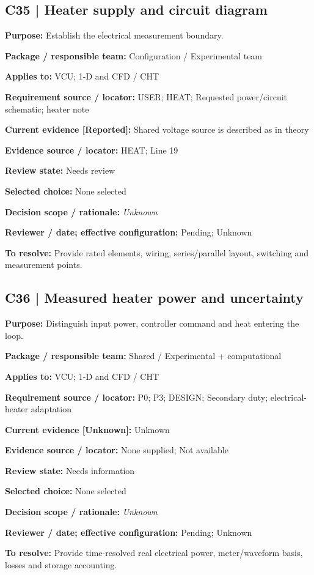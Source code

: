 \documentclass[11pt]{article}
\begin{document}
\begin{minipage}{\textwidth}\small\setlength{\parskip}{2pt}
\subsection*{C35 | Heater supply and circuit diagram}
\textbf{Purpose:} Establish the electrical measurement boundary.\par
\textbf{Package / responsible team:} Configuration / Experimental team\par
\textbf{Applies to:} VCU; 1-D and CFD / CHT\par
\textbf{Requirement source / locator:} USER; HEAT; Requested power/circuit schematic; heater note\par
\textbf{Current evidence [Reported]:} Shared voltage source is described as in theory\par
\textbf{Evidence source / locator:} HEAT; Line 19\par
\textbf{Review state:} Needs review\par
\textbf{Selected choice:} None selected\par
\textbf{Decision scope / rationale:} \textit{Unknown}\par
\textbf{Reviewer / date; effective configuration:} Pending; Unknown\par
\textbf{To resolve:} Provide rated elements, wiring, series/parallel layout, switching and measurement points.\par
\end{minipage}\par\vspace{5pt}
\begin{minipage}{\textwidth}\small\setlength{\parskip}{2pt}
\subsection*{C36 | Measured heater power and uncertainty}
\textbf{Purpose:} Distinguish input power, controller command and heat entering the loop.\par
\textbf{Package / responsible team:} Shared / Experimental + computational\par
\textbf{Applies to:} VCU; 1-D and CFD / CHT\par
\textbf{Requirement source / locator:} P0; P3; DESIGN; Secondary duty; electrical-heater adaptation\par
\textbf{Current evidence [Unknown]:} Unknown\par
\textbf{Evidence source / locator:} None supplied; Not available\par
\textbf{Review state:} Needs information\par
\textbf{Selected choice:} None selected\par
\textbf{Decision scope / rationale:} \textit{Unknown}\par
\textbf{Reviewer / date; effective configuration:} Pending; Unknown\par
\textbf{To resolve:} Provide time-resolved real electrical power, meter/waveform basis, losses and storage accounting.\par
\end{minipage}\par\vspace{5pt}
\end{document}
